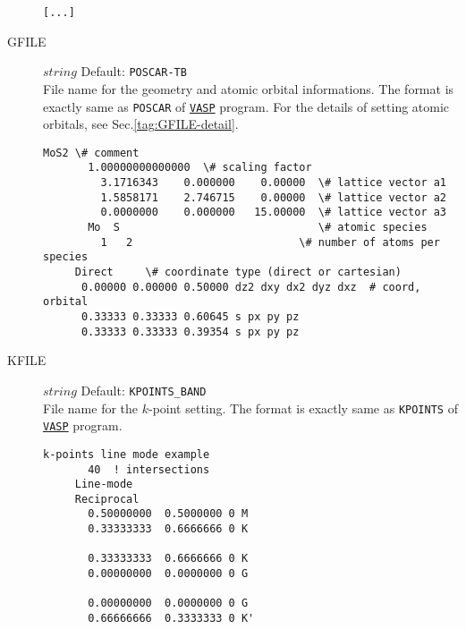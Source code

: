 \documentclass[a4paper,12pt]{scrartcl}
\makeatletter
\def\namedlabel#1#2{\begingroup
    #2%
    \def\@currentlabel{#2}%
    \phantomsection\label{#1}\endgroup
}
\makeatother
\begin{document}
\begin{description}
\begin{Verbatim}[commandchars=\\\{\},gobble=4, frame=single, framesep=2mm, 
		   	label= EFILE DFT\_BANDSTRUCTURE.out example ,
		   	labelposition=bottomline]
            [...]

		\end{Verbatim}
    \item[\namedlabel{tag:GFILE}{GFILE}] $string$ Default: \texttt{POSCAR-TB}\\
        File name for the geometry and atomic orbital informations. 
		The format is exactly same as \texttt{POSCAR} of \href{https://www.vasp.at}{\texttt{VASP}}
		program. For the details of setting atomic orbitals, see Sec.\ref{tag:GFILE-detail}.

        \begin{Verbatim}[commandchars=\\\{\},gobble=4, frame=single, framesep=2mm, 
            label= POSCAR-TB example: MoS$_2$ with \texttt{Mo}-$d$ and \texttt{S}-$s$$p$,
            labelposition=bottomline]
     MoS2 \# comment
       1.00000000000000  \# scaling factor
         3.1716343    0.000000    0.00000  \# lattice vector a1
         1.5858171    2.746715    0.00000  \# lattice vector a2
         0.0000000    0.000000   15.00000  \# lattice vector a3
       Mo  S                               \# atomic species
         1   2                          \# number of atoms per species
     Direct     \# coordinate type (direct or cartesian)
      0.00000 0.00000 0.50000 dz2 dxy dx2 dyz dxz  # coord, orbital
      0.33333 0.33333 0.60645 s px py pz              
      0.33333 0.33333 0.39354 s px py pz

        \end{Verbatim}

    \item[\namedlabel{tag:KFILE}{KFILE}] $string$ Default: \texttt{KPOINTS\_BAND}\\
        File name for the $k$-point setting.
        The format is exactly same as \texttt{KPOINTS} of \href{https://www.vasp.at}{\texttt{VASP}}
        program.

        \begin{Verbatim}[commandchars=\\\{\},gobble=4, frame=single, framesep=2mm, 
            label= KPOINTS\_BAND $line$ $mode$ example, 
            labelposition=bottomline]
     k-points line mode example
       40  ! intersections
     Line-mode
     Reciprocal
       0.50000000  0.5000000 0 M
       0.33333333  0.6666666 0 K
       
       0.33333333  0.6666666 0 K
       0.00000000  0.0000000 0 G
       
       0.00000000  0.0000000 0 G
       0.66666666  0.3333333 0 K'


\end{Verbatim}
\end{description}
\end{document}
